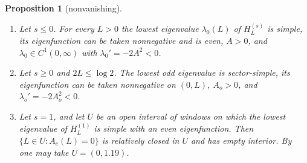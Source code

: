 \documentclass[11pt]{amsart}
\newtheorem{proposition}[theorem]{Proposition}
\theoremstyle{definition}
\theoremstyle{remark}
\numberwithin{equation}{section}
\begin{document}
\begin{proposition}[nonvanishing]\label{prop:nonvan}
\begin{enumerate}
\item[(a)] Let $s\le0$. For every $L>0$ the lowest eigenvalue $\lambda_0(L)$ of $H^{(s)}_L$ is simple, its eigenfunction can be taken nonnegative and is even, $A>0$, and $\lambda_0\in C^1(0,\infty)$ with $\lambda_0'=-2A^2<0$.
\item[(b)] Let $s\ge0$ and $2L\le\log2$. The lowest odd eigenvalue is sector-simple, its eigenfunction can be taken nonnegative on $(0,L)$, $A_o>0$, and $\lambda_o'=-2A_o^2<0$.
\item[(c)] Let $s=1$, and let $U$ be an open interval of windows on which the lowest eigenvalue of $H^{(1)}_L$ is simple with an even eigenfunction. Then $\{L\in U:A_e(L)=0\}$ is relatively closed in $U$ and has empty interior. By~\cite{GS} one may take $U=(0,1.19)$.
\end{enumerate}
\end{proposition}
\end{document}
